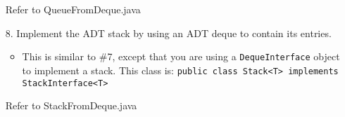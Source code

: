 \documentclass[10pt]{article}
\begin{document}
\begin{enumerate}
			\vspace{0.5cm}
			Refer to QueueFromDeque.java
			\vspace{0.5cm}
		
		\item[8.] Implement the ADT stack by using an ADT deque to contain its entries.
			
			\begin{itemize}
				\item This is similar to \#7, except that you are using a \texttt{DequeInterface} object to implement a stack. This class is: \texttt{public class Stack<T> implements StackInterface<T>}
			\end{itemize}
			
			\vspace{0.5cm}
			Refer to StackFromDeque.java
			\vspace{0.5cm}
	\end{enumerate}
\end{document}

